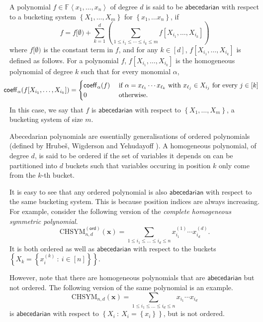 \documentclass[10pt,a4paper]{article}
\def\Hrubes{Hrube{\v{s}}}
\def\Field{\mathbb{F}}
\let\F\Field
\def\set#1{\left\{ #1 \right\}}
\def\inparen#1{\left( #1 \right)}
\def\inbrace#1{\left\{ #1 \right\}}
\def\inangle#1{\left\langle #1 \right\rangle}
\def\setdef#1#2{\inbrace{ #1 \ : \ #2}}
\def\vecx{\mathbf{x}}
\newcommand{\coeff}{\operatorname{\mathsf{coeff}}}
\newcommand{\abcd}{\mathsf{abecedarian}}
\newcommand{\chsym}[2]{\mathrm{CHSYM}_{#1,#2}}
\newcommand{\ochsym}[2]{\mathrm{CHSYM}_{#1,#2}^{\mathsf{(ord)}}}
\begin{document}
\begin{definition}\label{def:ordPoly}
	A polynomial $f \in \F\inangle{x_1, \ldots, x_n}$ of degree $d$ is said to be $\abcd$ with respect to a bucketing system $\set{X_1, \ldots, X_m}$ for $\set{x_1, \ldots x_n}$, if  
	\[
		f = f[\emptyset) + \sum_{k=1}^{d} \inparen{\sum_{1 \leq i_1 \leq \cdots \leq i_k \leq m} f[X_{i_1}, \ldots, X_{i_k}]}
	\] 
	where $f[\emptyset)$ is the constant term in $f$, and for any $k \in [d]$, $f[X_{i_1}, \ldots, X_{i_k}]$ is defined as follows. 
	For a polynomial $f$, $f[X_{i_1}, \ldots, X_{i_k}]$ is the homogeneous polynomial of degree $k$ such that for every monomial $\alpha$,
	\[
		\hspace{-1em} \coeff_\alpha(f[X_{i_1}, \ldots, X_{i_k}]) =
		\begin{cases}
			\coeff_\alpha(f) & \text{ if } \alpha = x_{\ell_1} \cdots x_{\ell_k} \text{ with } x_{\ell_j} \in X_{i_j} \text{ for every } j \in [k]\\
			0 & \text{ otherwise.} 
		\end{cases}
	\]
	In this case, we say that $f$ is $\abcd$ with respect to $\set{X_1, \ldots, X_m}$, a bucketing system of size $m$.
\end{definition}

Abecedarian polynomials are essentially generalisations of ordered polynomials (defined by {\Hrubes}, Wigderson and Yehudayoff \cite{HWY11}).
A homogeneous polynomial, of degree $d$, is said to be ordered if the set of variables it depends on can be partitioned into $d$ buckets such that variables occuring in position $k$ only come from the $k$-th bucket.

It is easy to see that any ordered polynomial is also $\abcd$ with respect to the same bucketing system.
This is because position indices are always increasing. 
For example, consider the following version of the \emph{complete homogeneous symmetric polynomial}.
\[
	\ochsym{n}{d} (\vecx) = \sum_{1 \leq i_1 \leq \ldots \leq i_d \leq n} x^{(1)}_{i_1} \cdots x^{(d)}_{i_d}.
\]
It is both ordered as well as $\abcd$ with respect to the buckets $\set{X_k = \setdef{x^{(k)}_i}{i \in [n]}}$.

However, note that there are homogeneous polynomials that are $\abcd$ but not ordered.
The following version of the same polynomial is an example.
\[
	\chsym{n}{d} (\vecx) = \sum_{1 \leq i_1 \leq \ldots \leq i_d \leq n} x_{i_1} \cdots x_{i_d}
\]
is $\abcd$ with respect to $\setdef{X_i}{X_i = \set{x_i}}$, but is not ordered.
\end{document}
